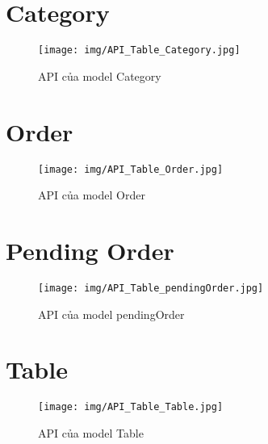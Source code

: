\documentclass{report}
\begin{document}
\section{Category}

\begin{figure}[H]
    \begin{center}
    	\texttt{[image: img/API\_Table\_Category.jpg]}
    	\linebreak
    	\caption{API của model Category}
    \end{center}
\end{figure}


\section{Order}

\begin{figure}[H]
    \begin{center}
    	\texttt{[image: img/API\_Table\_Order.jpg]}
    	\linebreak
    	\caption{API của model Order}
    \end{center}
\end{figure}

\section{Pending Order}

\begin{figure}[H]
    \begin{center}
    	\texttt{[image: img/API\_Table\_pendingOrder.jpg]}
    	\linebreak
    	\caption{API của model pendingOrder}
    \end{center}
\end{figure}

\section{Table}

\begin{figure}[H]
    \begin{center}
    	\texttt{[image: img/API\_Table\_Table.jpg]}
    	\linebreak
    	\caption{API của model Table}
    \end{center}
\end{figure}
\end{document}
